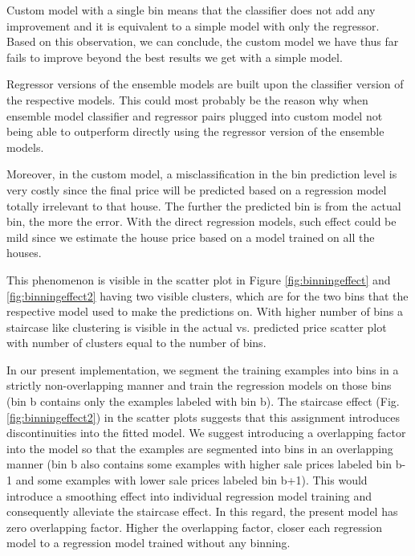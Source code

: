 \documentclass[conference,compsoc]{IEEEtran}
\begin{document}
\par
Custom model with a single bin means that the classifier does not add any improvement and it is equivalent to a simple model with only the regressor. Based on this observation, we can conclude, the custom model we have thus far fails to improve beyond the best results we get with a simple model.

\par
Regressor versions of the ensemble models are built upon the classifier version of the respective models. This could most probably be the reason why when ensemble model classifier and regressor pairs plugged into custom model not being able to outperform directly using the regressor version of the ensemble models. 


\par
Moreover, in the custom model, a misclassification in the bin prediction level is very costly since the final price will be predicted based on a regression model totally irrelevant to that house. The further the predicted bin is from the actual bin, the more the error. With the direct regression models, such effect could be mild since we estimate the house price based on a model trained on all the houses.

\par
This phenomenon is visible in the scatter plot in Figure \ref{fig:binningeffect} and \ref{fig:binningeffect2} having two visible clusters, which are for the two bins that the respective model used to make the predictions on. With higher number of bins a staircase like clustering is visible in the actual vs. predicted price scatter plot with number of clusters equal to the number of bins.

\par
In our present implementation, we segment the training examples into bins in a strictly non-overlapping manner and train the regression models on those bins (bin b contains only the examples labeled with bin b). The staircase effect (Fig. \ref{fig:binningeffect2}) in the scatter plots suggests that this assignment introduces discontinuities into the fitted model. We suggest introducing a overlapping factor into the model so that the examples are segmented into bins in an overlapping manner (bin b also contains some examples with higher sale prices labeled bin b-1 and some examples with lower sale prices labeled bin b+1). This would introduce a smoothing effect into individual regression model training and consequently alleviate the staircase effect. In this regard, the present model has zero overlapping factor. Higher the overlapping factor, closer each regression model to a regression model trained without any binning.
\end{document}
